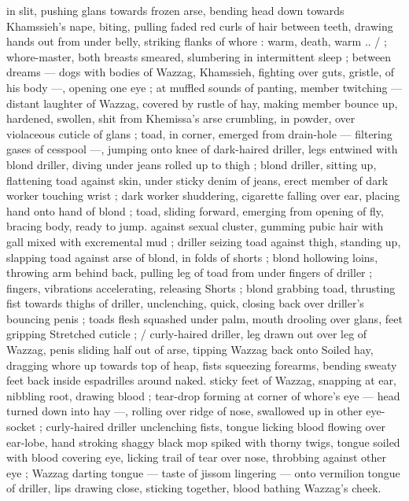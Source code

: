 in slit, pushing glans towards frozen arse, bending head down 
towards Khamssieh's nape, biting, pulling faded red curls of hair 
between teeth, drawing hands out from under belly, striking flanks of 
whore : {\gl}{\td} warm, death, warm ..{\gr} {\slash} ; whore-master, both breasts 
smeared, slumbering in intermittent sleep ; between dreams --- dogs 
with bodies of Wazzag, Khamssieh, fighting over guts, gristle, of his 
body ---, opening one eye ; at muffled sounds of panting, member 
twitching --- distant laughter of Wazzag, covered by rustle of hay, 
making member bounce up, hardened, swollen, shit from Khemissa's 
arse crumbling, in powder, over violaceous cuticle of glans ; toad, in 
corner, emerged from drain-hole --- filtering gases of cesspool ---, 
jumping onto knee of dark-haired driller, legs entwined with blond 
driller, diving under jeans rolled up to thigh ; blond driller, sitting up, 
flattening toad against skin, under sticky denim of jeans, erect 
member of dark worker touching wrist ; dark worker shuddering, 
cigarette falling over ear, placing hand onto hand of blond ; toad, 
sliding forward, emerging from opening of fly, bracing body, ready to 
jump. against sexual cluster, gumming pubic hair with gall mixed with 
excremental mud ; driller seizing toad against thigh, standing up, 
slapping toad against arse of blond, in folds of shorts ; blond 
hollowing loins, throwing arm behind back, pulling leg of toad from 
under fingers of driller ; fingers, vibrations accelerating, releasing 
Shorts ; blond grabbing toad, thrusting fist towards thighs of driller, 
unclenching, quick, closing back over driller's bouncing penis ; toads 
flesh squashed under palm, mouth drooling over glans, feet gripping 
Stretched cuticle ; {\slash} curly-haired driller, leg drawn out over leg of 
Wazzag, penis sliding half out of arse, tipping Wazzag back onto 
Soiled hay, dragging whore up towards top of heap, fists squeezing 
forearms, bending sweaty feet back inside espadrilles around naked. 
sticky feet of Wazzag, snapping at ear, nibbling root, drawing blood 
; tear-drop forming at corner of whore's eye --- head turned down 
into hay ---, rolling over ridge of nose, swallowed up in other eye- 
socket ; curly-haired driller unclenching fists, tongue licking blood 
flowing over ear-lobe, hand stroking shaggy black mop spiked with 
thorny twigs, tongue soiled with blood covering eye, licking trail of 
tear over nose, throbbing against other eye ; Wazzag darting tongue 
--- taste of jissom lingering --- onto vermilion tongue of driller, lips 
drawing close, sticking together, blood bathing Wazzag's cheek. 
